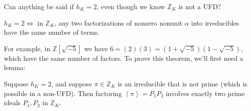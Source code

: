 \begin{question}

Can anything be said if \(h_K = 2\), even though we know
\({\mathbb{Z}}_K\) is not a UFD?

\end{question}

\begin{theorem}[Carlitz]

\(h_K = 2 \iff\) in \({\mathbb{Z}}_K\), any two factorizations of
nonzero nonunit \(\alpha\) into irreducibles have the same number of
terms.

\end{theorem}

\begin{remark}

For example, in \({\mathbb{Z}}[ \sqrt{-5} ]\) we have
\(6 = (2)(3) = (1 + \sqrt{-5} )(1 - \sqrt{-5} )\), which have the same
number of factors. To prove this theorem, we'll first need a lemma:

\end{remark}

\begin{lemma}

Suppose \(h_K = 2\), and suppose \(\pi \in {\mathbb{Z}}_K\) is an
irreducible that is not prime (which is possible in a non-UFD). Then
factoring \(\left\langle{ \pi }\right\rangle = P_1 P_2\) involves
exactly two prime ideals \(P_1, P_2\) in \({\mathbb{Z}}_K\).

\end{lemma}

